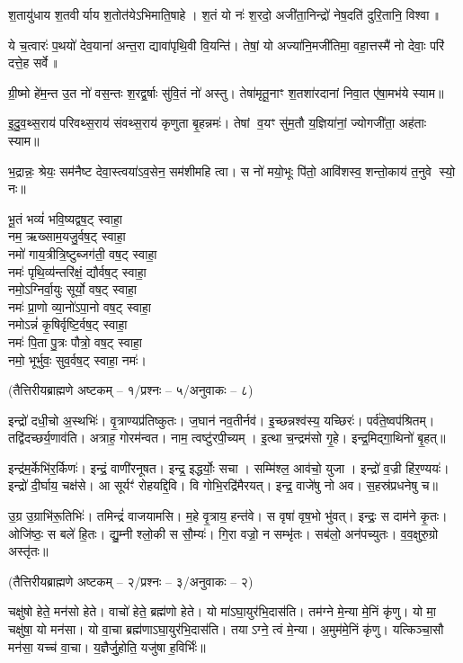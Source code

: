 श॒तायु॑धाय श॒तवीर्याय श॒तोत॑येऽभिमाति॒षाहे।
श॒तं यो नः॑ श॒रदो॒ अजी॑ता॒निन्द्रो॑ नेष॒दति॑ दुरि॒तानि॒ विश्वा॥

ये च॒त्वारः॑ प॒थयो॑ देव॒याना॑ अन्त॒रा द्यावा॑पृथि॒वी वि॒यन्ति॑।
तेषां॒ यो अज्या॑नि॒मजी॑तिमा॒ वहा॒त्तस्मै॑ नो देवाः॒ परि॑ दत्ते॒ह सर्वे॥

ग्री॒ष्मो हे॑म॒न्त उ॒त नो॑ वस॒न्तः श॒रद्व॒र्षाः सु॑वि॒तं नो॑ अस्तु।
तेषा॑मृतू॒नाꣳ श॒तशा॑रदानां निवा॒त ए॑षा॒मभ॑ये स्याम॥

इ॒दु॒व॒थ्स॒राय॑ परिवथ्स॒राय॑ संवथ्स॒राय॑ कृणुता बृ॒हन्नमः॑।
तेषां व॒यꣳ सु॑म॒तौ य॒ज्ञिया॑नां॒ ज्योगजी॑ता॒ अह॑ताः स्याम॥

भ॒द्रान्नः॒ श्रेयः॒ सम॑नैष्ट देवा॒स्त्वया॑ऽव॒सेन॒ सम॑शीमहि त्वा।
स नो॑ मयो॒भूः पि॑तो॒ आवि॑शस्व॒ शन्तो॒काय॑ त॒नुवे स्यो॒ नः॥

भू॒तं भव्यं॑ भवि॒ष्यद्वष॒ट् स्वाहा॒\\
नम॒ ऋख्साम॒यजु॒र्वष॒ट् स्वाहा॒\\
नमो॑ गाय॒त्रीत्रि॒ष्टुब्जग॑ती॒ वष॒ट् स्वाहा॒\\
नमः॑ पृथि॒व्य॑न्तरि॑क्षं॒ द्यौर्वष॒ट् स्वाहा॒\\
नमो॒ऽग्निर्वा॒युः सूर्यो॒ वष॒ट् स्वाहा॒\\
नमः॑ प्रा॒णो व्या॒नो॑ऽपा॒नो वष॒ट् स्वाहा॒\\
नमोऽन्नं॑ कृ॒षिर्वृष्टि॒र्वष॒ट् स्वाहा॒\\
नमः॑ पि॒ता पु॒त्रः पौत्रो॒ वष॒ट् स्वाहा॒\\
नमो॒ भूर्भुवः॒ सुव॒र्वष॒ट् स्वाहा॒ नमः॑।

\centerline{\normalsize (तैत्तिरीयब्राह्मणे अष्टकम् – १/प्रश्नः – ५/अनुवाकः – ८)}

इन्द्रो॑ दधी॒चो अ॒स्थभिः॑।
वृ॒त्राण्यप्र॑तिष्कुतः।
ज॒घान॑ नव॒तीर्नव॑।
इ॒च्छन्नश्व॑स्य॒ यच्छिरः॑।
पर्व॑ते॒ष्वप॑श्रितम्।
तद्वि॑दच्छर्य॒णाव॑ति।
अत्राह॒ गोरम॑न्वत।
नाम॒ त्वष्टु॑रपी॒च्यम्।
इ॒त्था च॒न्द्रम॑सो गृ॒हे।
इन्द्र॒मिद्गा॒थिनो॑ बृ॒हत्॥

इन्द्र॑म॒र्केभि॑र॒र्किणः॑।
इन्द्रं॒ वाणी॑रनूषत।
इन्द्र॒ इद्धर्योः॒ सचा।
सम्मि॑श्ल॒ आव॑चो॒ युजा।
इन्द्रो॑ व॒ज्री हि॑र॒ण्ययः॑।
इन्द्रो॑ दी॒र्घाय॒ चक्ष॑से।
आ सूर्यꣳ॑ रोहयद्दि॒वि।
वि गोभि॒रद्रि॑मैरयत्।
इन्द्र॒ वाजे॑षु नो अव।
स॒हस्र॑प्रधनेषु च॥

उ॒ग्र उ॒ग्राभि॑रू॒तिभिः॑।
तमिन्द्रं॑ वाजयामसि।
म॒हे वृ॒त्राय॒ हन्त॑वे।
स वृषा॑ वृष॒भो भु॑वत्।
इन्द्रः॒ स दाम॑ने कृ॒तः।
ओजि॑ष्ठः॒ स बले॑ हि॒तः।
द्यु॒म्नी श्लो॒की स सौ॒म्यः॑।
गि॒रा वज्रो॒ न सम्भृ॑तः।
सब॑लो॒ अन॑पच्युतः।
व॒व॒क्षुरु॒ग्रो अस्तृ॑तः॥

\centerline{\normalsize (तैत्तिरीयब्राह्मणे अष्टकम् – २/प्रश्नः – ३/अनुवाकः – २)}
चक्षु॑षो हेते॒ मन॑सो हेते।
वाचो॑ हेते॒ ब्रह्म॑णो हेते।
यो मा॑ऽघा॒युर॑भि॒दास॑ति।
तम॑ग्ने मे॒न्या मे॒निं कृ॑णु।
यो मा॒ चक्षु॑षा॒ यो मन॑सा।
यो वा॒चा ब्रह्म॑णाऽघा॒युर॑भि॒दास॑ति।
तयाऽग्ने॒ त्वं मे॒न्या।
अ॒मुम॑मे॒निं कृ॑णु।
यत्किञ्चा॒सौ मन॑सा॒ यच्च॑ वा॒चा।
य॒ज्ञैर्जु॒होति॒ यजु॑षा ह॒विर्भिः॑॥

